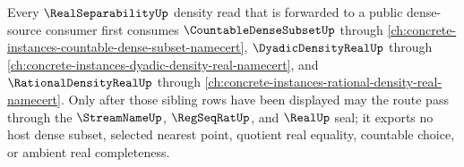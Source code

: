 Every $\RealSeparabilityUp$ density read that is forwarded to a public dense-source consumer first consumes $\CountableDenseSubsetUp$ through \autoref{ch:concrete-instances-countable-dense-subset-namecert}, $\DyadicDensityRealUp$ through \autoref{ch:concrete-instances-dyadic-density-real-namecert}, and $\RationalDensityRealUp$ through \autoref{ch:concrete-instances-rational-density-real-namecert}. Only after those sibling rows have been displayed may the route pass through the $\StreamNameUp$, $\RegSeqRatUp$, and $\RealUp$ seal; it exports no host dense subset, selected nearest point, quotient real equality, countable choice, or ambient real completeness.
